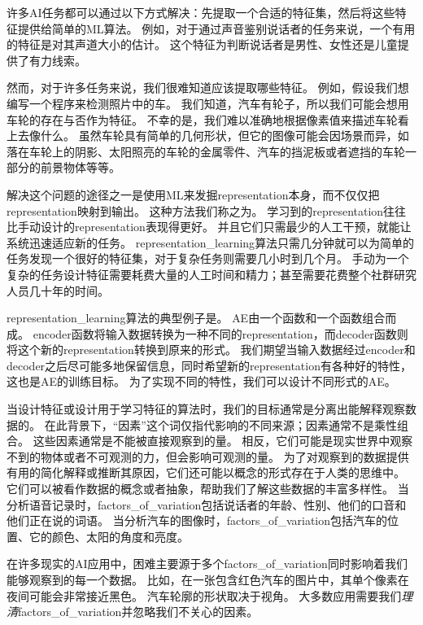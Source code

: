 许多\gls{AI}任务都可以通过以下方式解决：先提取一个合适的特征集，然后将这些特征提供给简单的\gls{ML}算法。
例如，对于通过声音鉴别说话者的任务来说，一个有用的特征是对其声道大小的估计。
这个特征为判断说话者是男性、女性还是儿童提供了有力线索。

然而，对于许多任务来说，我们很难知道应该提取哪些特征。
例如，假设我们想编写一个程序来检测照片中的车。
我们知道，汽车有轮子，所以我们可能会想用车轮的存在与否作为特征。
不幸的是，我们难以准确地根据像素值来描述车轮看上去像什么。
虽然车轮具有简单的几何形状，但它的图像可能会因场景而异，如落在车轮上的阴影、太阳照亮的车轮的金属零件、汽车的挡泥板或者遮挡的车轮一部分的前景物体等等。


解决这个问题的途径之一是使用\gls{ML}来发掘\gls{representation}本身，而不仅仅把\gls{representation}映射到输出。
这种方法我们称之为。
学习到的\gls{representation}往往比手动设计的\gls{representation}表现得更好。
并且它们只需最少的人工干预，就能让系统迅速适应新的任务。
\gls{representation_learning}算法只需几分钟就可以为简单的任务发现一个很好的特征集，对于复杂任务则需要几小时到几个月。
手动为一个复杂的任务设计特征需要耗费大量的人工时间和精力；甚至需要花费整个社群研究人员几十年的时间。

\gls{representation_learning}算法的典型例子是。
\gls{AE}由一个函数和一个函数组合而成。
\gls{encoder}函数将输入数据转换为一种不同的\gls{representation}，而\gls{decoder}函数则将这个新的\gls{representation}转换到原来的形式。
我们期望当输入数据经过\gls{encoder}和\gls{decoder}之后尽可能多地保留信息，同时希望新的\gls{representation}有各种好的特性，
这也是\gls{AE}的训练目标。
为了实现不同的特性，我们可以设计不同形式的\gls{AE}。

当设计特征或设计用于学习特征的算法时，我们的目标通常是分离出能解释观察数据的。
在此背景下，``因素''这个词仅指代影响的不同来源；因素通常不是乘性组合。
这些因素通常是不能被直接观察到的量。
相反，它们可能是现实世界中观察不到的物体或者不可观测的力，但会影响可观测的量。
为了对观察到的数据提供有用的简化解释或推断其原因，它们还可能以概念的形式存在于人类的思维中。
它们可以被看作数据的概念或者抽象，帮助我们了解这些数据的丰富多样性。
当分析语音记录时，\gls{factors_of_variation}包括说话者的年龄、性别、他们的口音和他们正在说的词语。
当分析汽车的图像时，\gls{factors_of_variation}包括汽车的位置、它的颜色、太阳的角度和亮度。


在许多现实的\gls{AI}应用中，困难主要源于多个\gls{factors_of_variation}同时影响着我们能够观察到的每一个数据。
比如，在一张包含红色汽车的图片中，其单个像素在夜间可能会非常接近黑色。
汽车轮廓的形状取决于视角。
大多数应用需要我们\emph{理清}\gls{factors_of_variation}并忽略我们不关心的因素。

